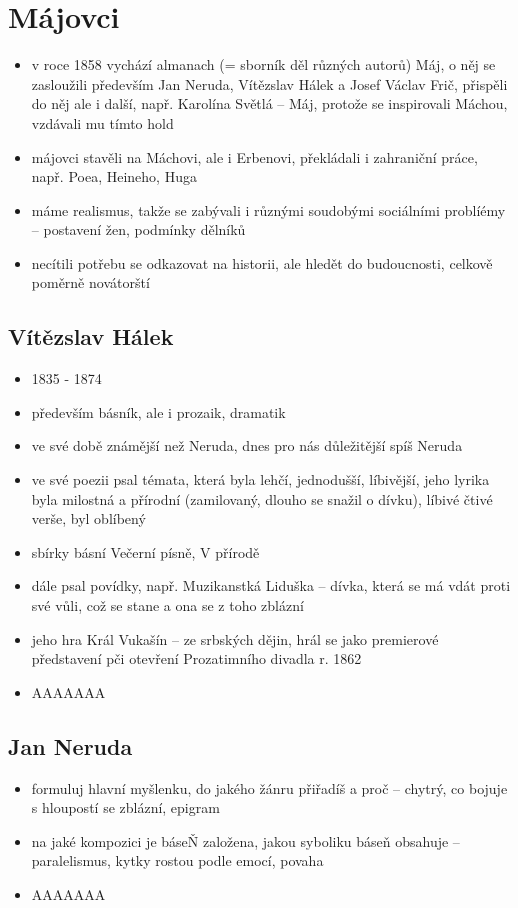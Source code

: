 \documentclass{article}
\begin{document}
\section{Májovci}
\begin{itemize}
  \item v roce 1858 vychází almanach (= sborník děl různých autorů) Máj, o něj se zasloužili především Jan Neruda, Vítězslav Hálek a Josef Václav Frič, přispěli do něj ale i další, např. Karolína Světlá -- Máj, protože se inspirovali Máchou, vzdávali mu tímto hold
  \item májovci stavěli na Máchovi, ale i Erbenovi, překládali i zahraniční práce, např. Poea, Heineho, Huga
  \item máme realismus, takže se zabývali i různými soudobými sociálními problíémy -- postavení žen, podmínky dělníků
  \item necítili potřebu se odkazovat na historii, ale hledět do budoucnosti, celkově poměrně novátorští
\end{itemize}

\subsection{Vítězslav Hálek}
\begin{itemize}
  \item 1835 - 1874
  \item především básník, ale i prozaik, dramatik
  \item ve své době známější než Neruda, dnes pro nás důležitější spíš Neruda
  \item ve své poezii psal témata, která byla lehčí, jednodušší, líbivější, jeho lyrika byla milostná a přírodní (zamilovaný, dlouho se snažil o dívku), líbivé čtivé verše, byl oblíbený
  \item sbírky básní Večerní písně, V přírodě
  \item dále psal povídky, např. Muzikanstká Liduška -- dívka, která se má vdát proti své vůli, což se stane a ona se z toho zblázní
  \item jeho hra Král Vukašín -- ze srbských dějin, hrál se jako premierové představení pči otevření Prozatimního divadla r. 1862
  \item AAAAAAA
\end{itemize}

\subsection{Jan Neruda}
\begin{itemize}
  \item formuluj hlavní myšlenku, do jakého žánru přiřadíš a proč -- chytrý, co bojuje s hloupostí se zblázní, epigram
  \item na jaké kompozici je báseŇ založena, jakou syboliku báseň obsahuje -- paralelismus, kytky rostou podle emocí, povaha
  \item AAAAAAA
\end{itemize}
\end{document}
